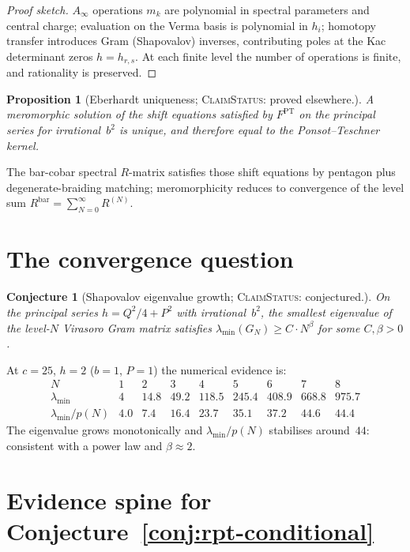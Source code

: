 \documentclass[11pt]{amsart}
\newtheorem{proposition}[theorem]{Proposition}
\newtheorem{conjecture}[theorem]{Conjecture}
\theoremstyle{definition}
\theoremstyle{remark}
\providecommand{\Ainf}{A_\infty}
\providecommand{\ClaimStatusProvedElsewhere}{\textsc{ClaimStatus}: proved elsewhere.}
\providecommand{\ClaimStatusConjectured}{\textsc{ClaimStatus}: conjectured.}
\begin{document}
\begin{proof}[Proof sketch]
$\Ainf$ operations $m_k$ are polynomial in spectral parameters and
central charge; evaluation on the Verma basis is polynomial in $h_i$;
homotopy transfer introduces Gram (Shapovalov) inverses, contributing
poles at the Kac determinant zeros $h = h_{r,s}$. At each finite
level the number of operations is finite, and rationality is
preserved.
\end{proof}

\begin{proposition}[Eberhardt uniqueness; \ClaimStatusProvedElsewhere]
\label{prop:eberhardt-uniqueness}
A meromorphic solution of the shift equations satisfied by
$F^{\mathrm{PT}}$ on the principal series for irrational~$b^2$ is
unique, and therefore equal to the Ponsot--Teschner kernel.
\end{proposition}

The bar-cobar spectral $R$-matrix satisfies those shift equations by
pentagon plus degenerate-braiding matching; meromorphicity reduces
to convergence of the level sum
$R^{\mathrm{bar}} = \sum_{N=0}^\infty R^{(N)}$.

\section{The convergence question}

\begin{conjecture}[Shapovalov eigenvalue growth;
\ClaimStatusConjectured]
\label{conj:shapovalov-growth}
On the principal series $h = Q^2/4 + P^2$ with irrational~$b^2$,
the smallest eigenvalue of the level-$N$ Virasoro Gram matrix
satisfies $\lambda_{\min}(G_N) \ge C \cdot N^\beta$ for some
$C, \beta > 0$.
\end{conjecture}

At $c = 25$, $h = 2$ ($b = 1$, $P = 1$) the numerical evidence is:
\[
\begin{array}{c|cccccccc}
N & 1 & 2 & 3 & 4 & 5 & 6 & 7 & 8 \\
\hline
\lambda_{\min} & 4 & 14.8 & 49.2 & 118.5 & 245.4 & 408.9 & 668.8 &
975.7 \\
\lambda_{\min}/p(N) & 4.0 & 7.4 & 16.4 & 23.7 & 35.1 & 37.2 & 44.6 &
44.4
\end{array}
\]
The eigenvalue grows monotonically and $\lambda_{\min}/p(N)$
stabilises around~$44$: consistent with a power law and
$\beta \approx 2$.

\section{Evidence spine for Conjecture~\ref{conj:rpt-conditional}}
\end{document}
